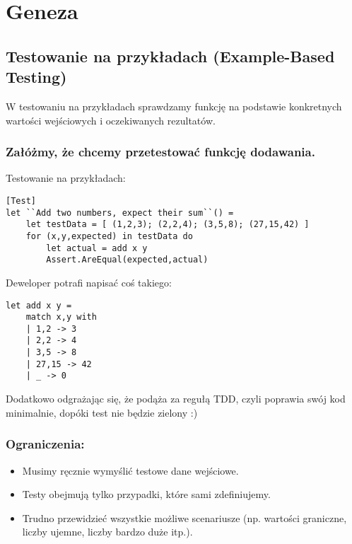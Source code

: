 \section{Geneza}

\subsection{Testowanie na przykładach (Example-Based Testing)}

W testowaniu na przykładach sprawdzamy funkcję na podstawie konkretnych wartości wejściowych i oczekiwanych rezultatów.

\subsubsection{Załóżmy, że chcemy przetestować funkcję dodawania.}

Testowanie na przykładach:
\lstset{language=FSharp, basicstyle=\scriptsize}
\begin{lstlisting}[frame=single,caption={Testowanie na przykładach},label=kod:listingA]
[Test]
let ``Add two numbers, expect their sum``() =
    let testData = [ (1,2,3); (2,2,4); (3,5,8); (27,15,42) ]
    for (x,y,expected) in testData do
        let actual = add x y
        Assert.AreEqual(expected,actual)
\end{lstlisting}

Deweloper potrafi napisać coś takiego:
\lstset{language=FSharp, basicstyle=\scriptsize}
\begin{lstlisting}[frame=single,caption={Testowany kod},label=kod:listingA]
let add x y =
    match x,y with
    | 1,2 -> 3
    | 2,2 -> 4
    | 3,5 -> 8
    | 27,15 -> 42
    | _ -> 0
\end{lstlisting}

Dodatkowo odgrażając się, że podąża za regułą TDD, czyli poprawia swój kod minimalnie, dopóki test nie będzie zielony :)

\subsubsection{Ograniczenia:}
\begin{itemize}
    \item Musimy ręcznie wymyślić testowe dane wejściowe.
    \item Testy obejmują tylko przypadki, które sami zdefiniujemy.
    \item Trudno przewidzieć wszystkie możliwe scenariusze (np. wartości graniczne, liczby ujemne, liczby bardzo duże itp.).
\end{itemize}

